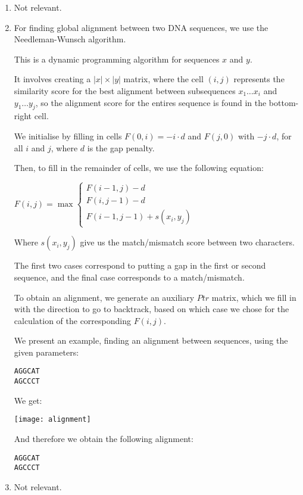 


\begin{enumerate}[label=(\alph*)]

  \item
    Not relevant.

  \item

    For finding global alignment between two DNA sequences, we use the Needleman-Wunsch algorithm.

    This is a dynamic programming algorithm for sequences $x$ and $y$.

    It involves creating a $|x| \times |y|$ matrix, where the cell $(i,j)$ represents the similarity score for the best alignment between subsequences $x_1\ldots x_i$ and $y_1\ldots y_j$, so the alignment score for the entires sequence is found in the bottom-right cell.

    We initialise by filling in cells $F(0,i) = -i \cdot d$ and $F(j,0)$ with $-j \cdot d$, for all $i$ and $j$, where $d$ is the gap penalty.

    Then, to fill in the remainder of cells, we use the following equation:

    $F(i,j) = \max\begin{cases}F(i -1, j) - d\\F(i, j-1) - d\\F(i-1, j-1) + s(x_i, y_j)\end{cases}$

    Where $s(x_i, y_j)$ give us the match/mismatch score between two characters.

    The first two cases correspond to putting a gap in the first or second sequence, and the final case corresponds to a match/mismatch.

    To obtain an alignment, we generate an auxiliary $Ptr$ matrix, which we fill in with the direction to go to backtrack, based on which case we chose for the calculation of the corresponding $F(i,j)$.

    We present an example, finding an alignment between sequences, using the given parameters:

\begin{verbatim}
AGGCAT
AGCCCT
\end{verbatim}

We get:

\texttt{[image: alignment]}

And therefore we obtain the following alignment:

\begin{verbatim}
AGGCAT
AGCCCT
\end{verbatim}



  \item
    Not relevant.

        
    \end{enumerate}

